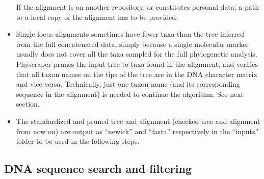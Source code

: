 \documentclass[]{article}
\begin{document}
\begin{itemize}
  If the alignment is on another repository, or constitutes personal data, a path to a local copy of the alignment has to be provided.
\item
  Single locus alignments sometimes have fewer taxa than the tree inferred from the full concatenated data, simply because a single molecular marker usually does not cover all the taxa sampled for the full phylogenetic analysis. Physcraper prunes the input tree to taxa found in the alignment, and verifies that all taxon names on the tips of the tree are in the DNA character matrix and vice versa. Technically, just one taxon name (and its corresponding sequence in the alignment) is needed to continue the algorithm. See next section.
\item
  The standardized and pruned tree and alignment (checked tree and alignment from now on) are output as ``newick'' and ``fasta'' respectively in the ``inputs'' folder to be used in the following steps.
\end{itemize}

\hypertarget{dna-sequence-search-and-filtering}{%
\subsection{DNA sequence search and filtering}\label{dna-sequence-search-and-filtering}}
\end{document}
